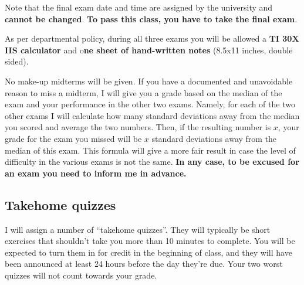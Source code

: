 \documentclass[11pt]{article}
\begin{document}
Note that the final exam date and time are assigned by the university and \textbf{cannot be changed}. \textbf{To pass this class, you have to take the final exam}.

\vspace{0.1 in}

As per departmental policy, during all three exams you will be allowed a \textbf{TI 30X IIS calculator} and o\textbf{ne sheet of hand-written notes} (8.5x11 inches, double sided).
\vspace{0.1 in}


No make-up midterms will be given. If you have a documented and unavoidable reason to miss a midterm, I will give you a grade based on the median of the exam and your performance in the other two exams. Namely, for each of the two other exams I will calculate how many standard deviations away from the median you scored and average the two numbers. Then, if the resulting number is $x$, your grade for the exam you missed will be $x$ standard deviations away from the median of this exam. This formula will give a more fair result in case the level of difficulty in the various exams is not the same. \textbf{In any case, to be excused for an exam you need to inform me in advance.}

\subsection*{Takehome quizzes}
I will assign a number of ``takehome quizzes''. They will typically be short exercises that shouldn't take you more than 10 minutes to complete. You will be expected to turn them in for credit in the beginning of class, and they will have been announced at least 24 hours before the day they're due. Your two worst quizzes will not count towards your grade.


\begin{comment}
  \vspace{1mm}
  subsection*{Worksheets}

  There will be a number of worksheet sessions done in class. You are strongly encouraged to work on them in groups and you can turn in your solutions, which will not be
  graded, but I will look at them so I can point out common mistakes and misconceptions before
  the actual exams.Their purpose is to encourage you to discuss some problems
  with other people in class, ask questions, and write down a
  solution for some problems in a stress-free
  environment. You will be notified about worksheet sessions ahead of time.
\end{comment}
\end{document}
